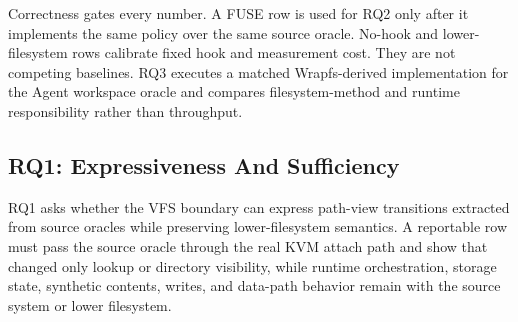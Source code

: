 Correctness gates every number. A FUSE row is used for RQ2 only after it
implements the same policy over the same source oracle. No-hook and
lower-filesystem rows calibrate fixed hook and measurement cost. They are not
competing baselines. RQ3 executes a matched Wrapfs-derived implementation for
the Agent workspace oracle and compares filesystem-method and runtime
responsibility rather than throughput.

\subsection{RQ1: Expressiveness And Sufficiency}

RQ1 asks whether the VFS boundary can express path-view transitions extracted
from source oracles while preserving lower-filesystem semantics. A reportable
row must pass the source oracle through the real KVM attach path and show that
\namei changed only lookup or directory visibility, while runtime orchestration,
storage state, synthetic contents, writes, and data-path behavior remain with
the source system or lower filesystem.

